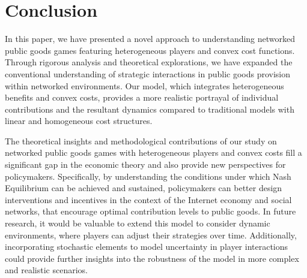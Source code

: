 \section{Conclusion}
\label{sec:conclusion}


In this paper, we have presented a novel approach to understanding networked public goods games featuring heterogeneous players and convex cost functions. Through rigorous analysis and theoretical explorations, we have expanded the conventional understanding of strategic interactions in public goods provision within networked environments. Our model, which integrates heterogeneous benefits and convex costs, provides a more realistic portrayal of individual contributions and the resultant dynamics compared to traditional models with linear and homogeneous cost structures.

The theoretical insights and methodological contributions of our study on networked public goods games with heterogeneous players and convex costs fill a significant gap in the economic theory and also provide new perspectives for policymakers. Specifically, by understanding the conditions under which Nash Equilibrium can be achieved and sustained, policymakers can better design interventions and incentives in the context of the Internet economy and social networks, that encourage optimal contribution levels to public goods. In future research, it would be valuable to extend this model to consider dynamic environments, where players can adjust their strategies over time. Additionally, incorporating stochastic elements to model uncertainty in player interactions could provide further insights into the robustness of the model in more complex and realistic scenarios.


